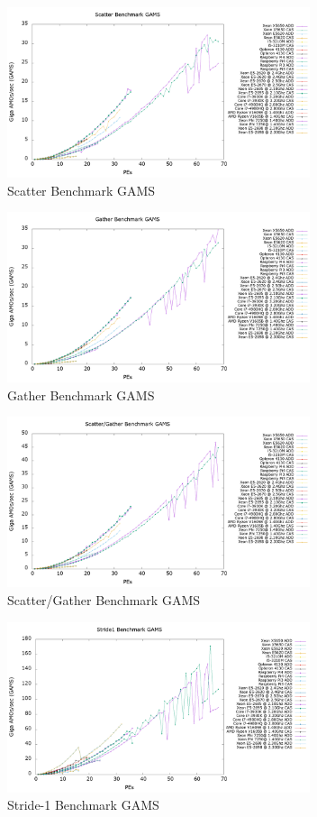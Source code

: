 \begin{figure}[!t]
\centering
\includegraphics[width=3.5in]{figures/SCATTER_GAMS.png}
\caption{Scatter Benchmark GAMS}
\label{fig:scatter_gams}
\end{figure}

\begin{figure}[!t]
\centering
\includegraphics[width=3.5in]{figures/GATHER_GAMS.png}
\caption{Gather Benchmark GAMS}
\label{fig:gather_gams}
\end{figure}

\begin{figure}[!t]
\centering
\includegraphics[width=3.5in]{figures/SG_GAMS.png}
\caption{Scatter/Gather Benchmark GAMS}
\label{fig:sg_gams}
\end{figure}

\begin{figure}[!t]
\centering
\includegraphics[width=3.5in]{figures/STRIDE1_GAMS.png}
\caption{Stride-1 Benchmark GAMS}
\label{fig:s1_gams}
\end{figure}

